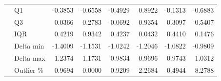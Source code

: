 \begin{table}[H]
\begin{tabular}{llrrrrrr}
 & Q1 & {\cellcolor[HTML]{F8D7DA}} -0.3853 & {\cellcolor[HTML]{F8D7DA}} -0.6558 & {\cellcolor[HTML]{F8D7DA}} -0.4929 & {\cellcolor[HTML]{F8D7DA}} 0.8922 & {\cellcolor[HTML]{D1E7DD}} -0.1313 & {\cellcolor[HTML]{F8D7DA}} -0.6883 \\
 & Q3 & {\cellcolor[HTML]{D1E7DD}} 0.0366 & 0.2783 & {\cellcolor[HTML]{D1E7DD}} -0.0692 & {\cellcolor[HTML]{F8D7DA}} 0.9354 & {\cellcolor[HTML]{F8D7DA}} 0.3097 & {\cellcolor[HTML]{F8D7DA}} -0.5407 \\
 & IQR & {\cellcolor[HTML]{F8D7DA}} 0.4219 & {\cellcolor[HTML]{F8D7DA}} 0.9342 & {\cellcolor[HTML]{F8D7DA}} 0.4237 & 0.0432 & {\cellcolor[HTML]{F8D7DA}} 0.4410 & 0.1476 \\
 & Delta min & {\cellcolor[HTML]{F8D7DA}} -1.4009 & {\cellcolor[HTML]{F8D7DA}} -1.1531 & {\cellcolor[HTML]{F8D7DA}} -1.0242 & {\cellcolor[HTML]{D1E7DD}} -1.2046 & -1.0822 & {\cellcolor[HTML]{F8D7DA}} -0.9809 \\
 & Delta max & {\cellcolor[HTML]{F8D7DA}} 1.2374 & 1.1731 & 0.9834 & {\cellcolor[HTML]{F8D7DA}} 0.9696 & {\cellcolor[HTML]{F8D7DA}} 0.9743 & {\cellcolor[HTML]{D1E7DD}} 1.0312 \\
 & Outlier \% & {\cellcolor[HTML]{F8D7DA}} 0.9694 & 0.0000 & {\cellcolor[HTML]{F8D7DA}} 0.9209 & 2.2684 & {\cellcolor[HTML]{D1E7DD}} 0.4944 & {\cellcolor[HTML]{F8D7DA}} 8.2788 \\
\end{tabular}
\end{table}
